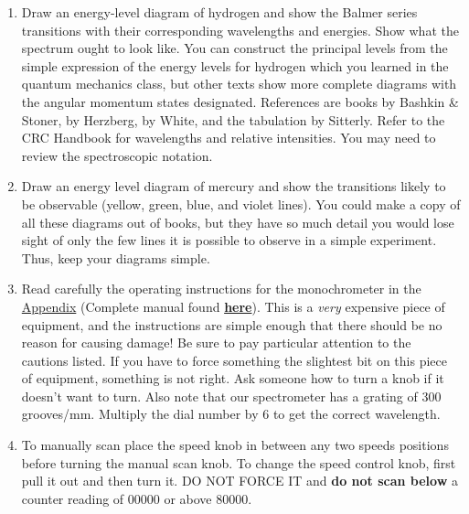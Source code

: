 \documentclass{../lab}
\begin{document}
\begin{enumerate}
    \item Draw an energy-level diagram of hydrogen and show the Balmer series transitions with their corresponding wavelengths and energies. Show what the spectrum ought to look like. You can construct the principal levels from the simple expression of the energy levels for hydrogen which you learned in the quantum mechanics class, but other texts show more complete diagrams with the angular momentum states designated. References are books by Bashkin \& Stoner, by Herzberg, by White, and the tabulation by Sitterly. Refer to the CRC Handbook for wavelengths and relative intensities. You may need to review the spectroscopic notation.

    \item Draw an energy level diagram of mercury and show the transitions likely to be observable (yellow, green, blue, and violet lines).
	You could make a copy of all these diagrams out of books, but they have so much detail you would lose sight of only the few lines it is possible to observe in a simple experiment. Thus, keep your diagrams simple.

    \item Read carefully the operating instructions for the monochrometer in the \hyperref[sec:Appendix]{ Appendix}
    (Complete manual found \href{http://physics111.lib.berkeley.edu/Physics111/Reprints/ATM/Acton\%20.5\%20atmospheric\%20monochromator.pdf}{\textbf{here}}). This is a \emph{very} expensive piece of equipment, and the instructions are simple enough that there should be no reason for causing damage! Be sure to pay particular attention to the cautions listed. If you have to force something the slightest bit on this piece of equipment, something is not right. Ask someone how to turn a knob if it doesn't want to turn. Also note that our spectrometer has a grating of 300 grooves/mm. Multiply the dial number by 6 to get the correct wavelength.

    \item To manually scan place the speed knob in between any two speeds positions before turning the manual scan knob. To change the speed control knob, first pull it out and then turn it. DO NOT FORCE IT and \textbf{do not scan below} a counter reading of 00000 or above 80000.


\end{enumerate}
\end{document}
